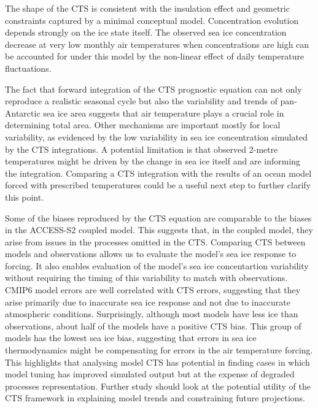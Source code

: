 \documentclass[tc, manuscript]{copernicus}
\begin{document}
The shape of the CTS is consistent with the insulation effect and
geometric constraints captured by a minimal conceptual model.
Concentration evolution depends strongly on the ice state itself. The
observed sea ice concentration decrease at very low monthly air
temperatures when concentrations are high can be accounted for under
this model by the non-linear effect of daily temperature fluctuations.

The fact that forward integration of the CTS prognostic equation can not
only reproduce a realistic seasonal cycle but also the variability and
trends of pan-Antarctic sea ice area suggests that air temperature plays
a crucial role in determining total area. Other mechanisms are important
mostly for local variability, as evidenced by the low variability in sea
ice concentration simulated by the CTS integrations. A potential
limitation is that observed 2-metre temperatures might be driven by the
change in sea ice itself and are informing the integration. Comparing a
CTS integration with the results of an ocean model forced with
prescribed temperatures could be a useful next step to further clarify
this point.

Some of the biases reproduced by the CTS equation are comparable to the
biases in the ACCESS-S2 coupled model. This suggests that, in the
coupled model, they arise from issues in the processes omitted in the
CTS. Comparing CTS between models and observations allows us to evaluate
the model's sea ice response to forcing. It also enables evaluation of
the model's sea ice concentartion variability without requiring the
timing of this variability to match with observations. CMIP6 model
errors are well correlated with CTS errors, suggesting that they arise
primarily due to inaccurate sea ice response and not due to inaccurate
atmospheric conditions. Surprisingly, although most models have less ice
than observations, about half of the models have a positive CTS bias.
This group of models has the lowest sea ice bias, suggesting that errors
in sea ice thermodynamics might be compensating for errors in the air
temperature forcing. This highlights that analysing model CTS has
potential in finding cases in which model tuning has improved simulated
output but at the expense of degraded processes representation. Further
study should look at the potential utility of the CTS framework in
explaining model trends and constraining future projections.
\end{document}
